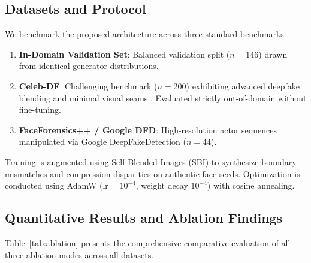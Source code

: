 \documentclass[journal,10pt,twocolumn]{article}
\begin{document}
\subsection{Datasets and Protocol}
We benchmark the proposed architecture across three standard benchmarks:
\begin{enumerate}
    \item \textbf{In-Domain Validation Set}: Balanced validation split ($n=146$) drawn from identical generator distributions.
    \item \textbf{Celeb-DF}: Challenging benchmark ($n=200$) exhibiting advanced deepfake blending and minimal visual seams \cite{li2020celebdf}. Evaluated strictly out-of-domain without fine-tuning.
    \item \textbf{FaceForensics++ / Google DFD}: High-resolution actor sequences manipulated via Google DeepFakeDetection ($n=44$).
\end{enumerate}

Training is augmented using Self-Blended Images (SBI) \cite{shiohara2022sbi} to synthesize boundary mismatches and compression disparities on authentic face seeds. Optimization is conducted using AdamW ($\text{lr} = 10^{-4}$, weight decay $10^{-4}$) with cosine annealing.

\subsection{Quantitative Results and Ablation Findings}

Table~\ref{tab:ablation} presents the comprehensive comparative evaluation of all three ablation modes across all datasets. 
\end{document}
